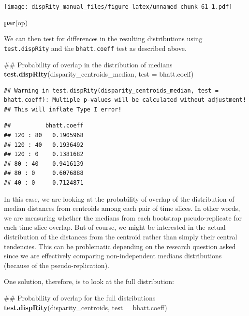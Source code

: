 \documentclass[]{book}
\newenvironment{Shaded}{\begin{snugshade}}{\end{snugshade}}
\newcommand{\KeywordTok}[1]{\textcolor[rgb]{0.13,0.29,0.53}{\textbf{#1}}}
\newcommand{\DataTypeTok}[1]{\textcolor[rgb]{0.13,0.29,0.53}{#1}}
\newcommand{\NormalTok}[1]{#1}
\theoremstyle{definition}
\theoremstyle{definition}
\theoremstyle{remark}
\begin{document}
\texttt{[image: dispRity\_manual\_files/figure-latex/unnamed-chunk-61-1.pdf]}

\begin{Shaded}
\begin{Highlighting}[]
\KeywordTok{par}\NormalTok{(op)}
\end{Highlighting}
\end{Shaded}

We can then test for differences in the resulting distributions using
\texttt{test.dispRity} and the \texttt{bhatt.coeff} test as described
above.

\begin{Shaded}
\begin{Highlighting}[]
\NormalTok{## Probability of overlap in the distribution of medians}
\KeywordTok{test.dispRity}\NormalTok{(disparity_centroids_median, }\DataTypeTok{test =}\NormalTok{ bhatt.coeff)}
\end{Highlighting}
\end{Shaded}

\begin{verbatim}
## Warning in test.dispRity(disparity_centroids_median, test = bhatt.coeff): Multiple p-values will be calculated without adjustment!
## This will inflate Type I error!
\end{verbatim}

\begin{verbatim}
##          bhatt.coeff
## 120 : 80   0.1905968
## 120 : 40   0.1936492
## 120 : 0    0.1381682
## 80 : 40    0.9416139
## 80 : 0     0.6076888
## 40 : 0     0.7124871
\end{verbatim}

In this case, we are looking at the probability of overlap of the
distribution of median distances from centroids among each pair of time
slices. In other words, we are measuring whether the medians from each
bootstrap pseudo-replicate for each time slice overlap. But of course,
we might be interested in the actual distribution of the distances from
the centroid rather than simply their central tendencies. This can be
problematic depending on the research question asked since we are
effectively comparing non-independent medians distributions (because of
the pseudo-replication).

One solution, therefore, is to look at the full distribution:

\begin{Shaded}
\begin{Highlighting}[]
\NormalTok{## Probability of overlap for the full distributions}
\KeywordTok{test.dispRity}\NormalTok{(disparity_centroids, }\DataTypeTok{test =}\NormalTok{ bhatt.coeff)}
\end{Highlighting}
\end{Shaded}
\end{document}
